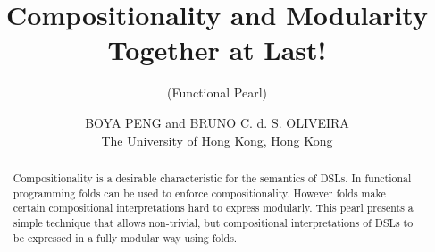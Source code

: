\documentclass{jfp1}
\begin{document}
\setlength{\pdfpageheight}{\paperheight}
\setlength{\pdfpagewidth}{\paperwidth}






\title{Compositionality and Modularity Together at Last!}
\subtitle{(Functional Pearl)}

\author[B. Peng and B. C. d. S. Oliveira]
        {BOYA PENG and BRUNO C. d. S. OLIVEIRA\\
         The University of Hong Kong, Hong Kong\\
         }


\maketitle

\begin{abstract}
Compositionality is a desirable characteristic for the semantics of
DSLs. In functional programming folds can be used to enforce
compositionality. However folds make certain compositional
interpretations hard to express modularly. This pearl presents a
simple technique that allows non-trivial, but compositional
interpretations of DSLs to be expressed in a fully modular way
using folds.


\begin{comment}

This paper presents composable algebra with dependencies: a new approach to compose 
algebras together to allow dependent interpretations with {\em fold}. 
For a given datatype represented by two-level-types\cite{sheard04}, if one of its 
interpretations depends on a second one, we compose the algebra correponding 
to the first interpretation with the one corresponding to the second, and use the 
composed algebra with {\em fold} to evaluate the expression. We present our approach 
on top of the domain specific language for parallel prefix circuits.

\end{comment}

\end{abstract}
\end{document}
